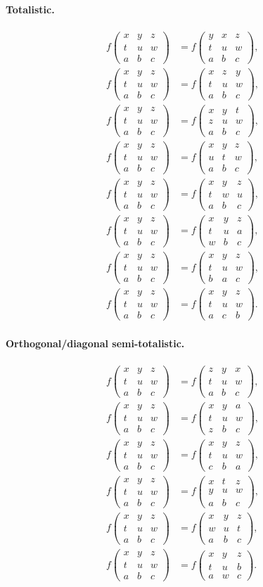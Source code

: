 \documentclass[11pt,a4paper]{article}
\newcommand{\nbhd}[9]{%
  \begin{smallmatrix}
  #1 & #2 & #3 \\
  #4 & #5 & #6 \\
  #7 & #8 & #9
  \end{smallmatrix}
}
\newcommand{\F}[1]{f\!\left(#1\right)}
\begin{document}
\paragraph{Totalistic.}
\begin{align*}
\F{\nbhd{x}{y}{z}{t}{u}{w}{a}{b}{c}} &= \F{\nbhd{y}{x}{z}{t}{u}{w}{a}{b}{c}},\\
\F{\nbhd{x}{y}{z}{t}{u}{w}{a}{b}{c}} &= \F{\nbhd{x}{z}{y}{t}{u}{w}{a}{b}{c}},\\
\F{\nbhd{x}{y}{z}{t}{u}{w}{a}{b}{c}} &= \F{\nbhd{x}{y}{t}{z}{u}{w}{a}{b}{c}},\\
\F{\nbhd{x}{y}{z}{t}{u}{w}{a}{b}{c}} &= \F{\nbhd{x}{y}{z}{u}{t}{w}{a}{b}{c}},\\
\F{\nbhd{x}{y}{z}{t}{u}{w}{a}{b}{c}} &= \F{\nbhd{x}{y}{z}{t}{w}{u}{a}{b}{c}},\\
\F{\nbhd{x}{y}{z}{t}{u}{w}{a}{b}{c}} &= \F{\nbhd{x}{y}{z}{t}{u}{a}{w}{b}{c}},\\
\F{\nbhd{x}{y}{z}{t}{u}{w}{a}{b}{c}} &= \F{\nbhd{x}{y}{z}{t}{u}{w}{b}{a}{c}},\\
\F{\nbhd{x}{y}{z}{t}{u}{w}{a}{b}{c}} &= \F{\nbhd{x}{y}{z}{t}{u}{w}{a}{c}{b}}.
\end{align*}

\paragraph{Orthogonal/diagonal semi-totalistic.}
\begin{align*}
\F{\nbhd{x}{y}{z}{t}{u}{w}{a}{b}{c}} &= \F{\nbhd{z}{y}{x}{t}{u}{w}{a}{b}{c}},\\
\F{\nbhd{x}{y}{z}{t}{u}{w}{a}{b}{c}} &= \F{\nbhd{x}{y}{a}{t}{u}{w}{z}{b}{c}},\\
\F{\nbhd{x}{y}{z}{t}{u}{w}{a}{b}{c}} &= \F{\nbhd{x}{y}{z}{t}{u}{w}{c}{b}{a}},\\
\F{\nbhd{x}{y}{z}{t}{u}{w}{a}{b}{c}} &= \F{\nbhd{x}{t}{z}{y}{u}{w}{a}{b}{c}},\\
\F{\nbhd{x}{y}{z}{t}{u}{w}{a}{b}{c}} &= \F{\nbhd{x}{y}{z}{w}{u}{t}{a}{b}{c}},\\
\F{\nbhd{x}{y}{z}{t}{u}{w}{a}{b}{c}} &= \F{\nbhd{x}{y}{z}{t}{u}{b}{a}{w}{c}}.
\end{align*}
\end{document}
